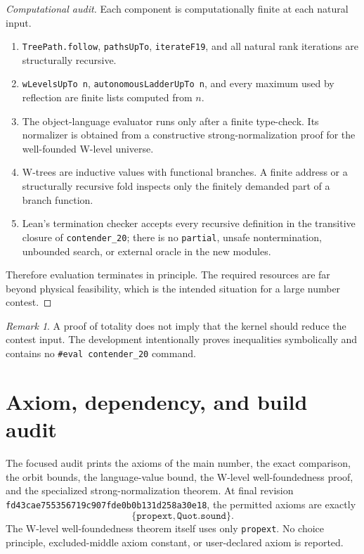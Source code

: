 \documentclass[11pt]{article}
\theoremstyle{definition}
\theoremstyle{remark}
\newtheorem{remark}[theorem]{Remark}
\newcommand{\FinalCommit}{\texttt{fd43cae755356719c907fde0b0b131d258a30e18}}
\begin{document}
\begin{proof}[Computational audit]
Each component is computationally finite at each natural input.

\begin{enumerate}[leftmargin=2.2em]
\item \texttt{TreePath.follow}, \texttt{pathsUpTo}, \texttt{iterateF19}, and
  all natural rank iterations are structurally recursive.
\item \texttt{wLevelsUpTo n}, \texttt{autonomousLadderUpTo n}, and every
  maximum used by reflection are finite lists computed from $n$.
\item The object-language evaluator runs only after a finite type-check.  Its
  normalizer is obtained from a constructive strong-normalization proof for
  the well-founded W-level universe.
\item W-trees are inductive values with functional branches.  A finite address
  or a structurally recursive fold inspects only the finitely demanded part of
  a branch function.
\item Lean's termination checker accepts every recursive definition in the
  transitive closure of \texttt{contender\_20}; there is no \texttt{partial},
  unsafe nontermination, unbounded search, or external oracle in the new
  modules.
\end{enumerate}

Therefore evaluation terminates in principle.  The required resources are far
beyond physical feasibility, which is the intended situation for a large
number contest.
\end{proof}

\begin{remark}
A proof of totality does not imply that the kernel should reduce the contest
input.  The development intentionally proves inequalities symbolically and
contains no \texttt{\#eval contender\_20} command.
\end{remark}

\section{Axiom, dependency, and build audit}
\label{sec:audit}

The focused audit prints the axioms of the main number, the exact comparison,
the orbit bounds, the language-value bound, the W-level well-foundedness proof,
and the specialized strong-normalization theorem.  At final revision
\FinalCommit{}, the permitted axioms are exactly
\[
  \{\texttt{propext},\texttt{Quot.sound}\}.
\]
The W-level well-foundedness theorem itself uses only \texttt{propext}.  No
choice principle, excluded-middle axiom constant, or user-declared axiom is
reported.
\end{document}
